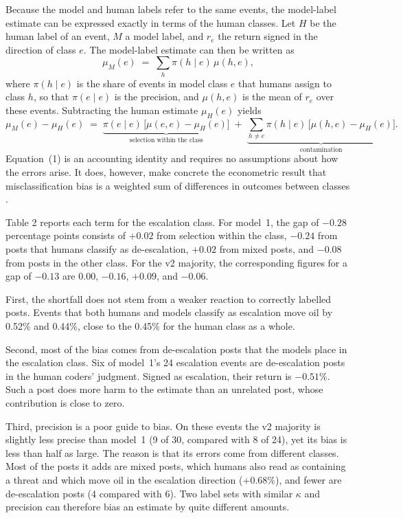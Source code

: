 \documentclass[12pt]{article}
\begin{document}
Because the model and human labels refer to the same events, the model-label estimate can be expressed exactly in terms of the human classes. Let $H$ be the human label of an event, $M$ a model label, and $r_e$ the return signed in the direction of class $e$. The model-label estimate can then be written as
\begin{equation}
\mu_M(e) \;=\; \sum_{h} \pi(h \mid e)\,\mu(h, e),
\label{eq:mixture}
\end{equation}
where $\pi(h \mid e)$ is the share of events in model class $e$ that humans assign to class $h$, so that $\pi(e \mid e)$ is the precision, and $\mu(h, e)$ is the mean of $r_e$ over these events. Subtracting the human estimate $\mu_H(e)$ yields
\begin{equation}
\mu_M(e) - \mu_H(e) \;=\; \underbrace{\pi(e \mid e)\,\big[\mu(e, e) - \mu_H(e)\big]}_{\text{selection within the class}} \;+\; \underbrace{\sum_{h \neq e} \pi(h \mid e)\,\big[\mu(h, e) - \mu_H(e)\big]}_{\text{contamination}}.
\label{eq:gap}
\end{equation}
Equation~(1) is an accounting identity and requires no assumptions about how the errors arise. It does, however, make concrete the econometric result that misclassification bias is a weighted sum of differences in outcomes between classes \citep{aigner1973, mahajan2006, lewbel2007}.

Table 2 reports each term for the escalation class. For model~1, the gap of $-0.28$ percentage points consists of $+0.02$ from selection within the class, $-0.24$ from posts that humans classify as de-escalation, $+0.02$ from mixed posts, and $-0.08$ from posts in the other class. For the v2 majority, the corresponding figures for a gap of $-0.13$ are 0.00, $-0.16$, $+0.09$, and $-0.06$.

First, the shortfall does not stem from a weaker reaction to correctly labelled posts. Events that both humans and models classify as escalation move oil by 0.52\% and 0.44\%, close to the 0.45\% for the human class as a whole.

Second, most of the bias comes from de-escalation posts that the models place in the escalation class. Six of model~1's 24 escalation events are de-escalation posts in the human coders' judgment. Signed as escalation, their return is $-0.51$\%. Such a post does more harm to the estimate than an unrelated post, whose contribution is close to zero.

Third, precision is a poor guide to bias. On these events the v2 majority is slightly less precise than model~1 (9 of 30, compared with 8 of 24), yet its bias is less than half as large. The reason is that its errors come from different classes. Most of the posts it adds are mixed posts, which humans also read as containing a threat and which move oil in the escalation direction ($+0.68$\%), and fewer are de-escalation posts (4 compared with 6). Two label sets with similar $\kappa$ and precision can therefore bias an estimate by quite different amounts.
\end{document}
